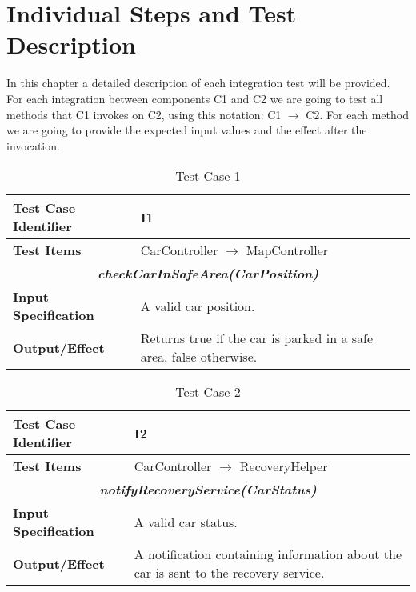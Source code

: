
\chapter{Individual Steps and Test Description}
In this chapter a detailed description of each integration test will be provided. For each integration between components C1 and C2 we are going to test all methods that C1 invokes on C2, using this notation: C1 $\rightarrow$ C2. For each method we are going to provide the expected input values and the effect after the invocation.

\begin{table}[H]
	\begin{tabularx}{\textwidth}{l X}
		\hline
		\textbf{Test Case Identifier}	&	I1\\	\hline
		\textbf{Test Items}			&	CarController $\rightarrow$ MapController \\	\hline\hline
		\multicolumn{2}{c}{\textbf{\textit{checkCarInSafeArea(CarPosition)}}}	\\	\hline
			\textbf{Input Specification}	&	A valid car position.\\	\hline
			\textbf{Output/Effect}	&	Returns true if the car is parked in a safe area, false otherwise.\\	\hline
	\end{tabularx}
	\captionsetup{textformat=empty,labelformat=blank}
	\caption{Test Case 1}
	\label{table:template-table-1}
\end{table}

\begin{table}[H]
	\begin{tabularx}{\textwidth}{l X}
		\hline
		\textbf{Test Case Identifier}	&	I2\\	\hline
		\textbf{Test Items}			&	CarController $\rightarrow$ RecoveryHelper \\	\hline\hline
		\multicolumn{2}{c}{\textbf{\textit{notifyRecoveryService(CarStatus)}}}	\\	\hline
			\textbf{Input Specification}	&	A valid car status.\\	\hline
			\textbf{Output/Effect}	&	A notification containing information about the car is sent to the recovery service.\\	\hline
	\end{tabularx}
	\captionsetup{textformat=empty,labelformat=blank}
	\caption{Test Case 2}
	\label{table:template-table-2}
\end{table}


